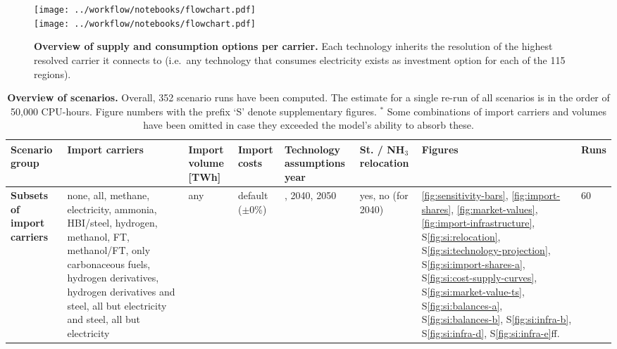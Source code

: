 \begin{figure}[!htb]
    \texttt{[image: ../workflow/notebooks/flowchart.pdf]} \\
    \texttt{[image: ../workflow/notebooks/flowchart.pdf]}
    \caption{\textbf{Overview of supply and consumption options per carrier.}
    Each technology inherits the resolution of the highest resolved carrier it
    connects to (i.e.~any technology that consumes electricity exists as
    investment option for each of the 115 regions).}
    \label{fig:si:supply-consumption-options}
\end{figure}

\begin{table}[!htb]
    \footnotesize
    \setlength{\extrarowheight}{4pt}
    \caption{\textbf{Overview of scenarios.} Overall, 352 scenario runs have
    been computed. The estimate for a single re-run of all scenarios is in the
    order of 50,000 CPU-hours. Figure numbers with the prefix `S' denote
    supplementary figures. $^*$ Some combinations of import carriers and volumes
    have been omitted in case they exceeded the model's ability to absorb
    these.}
    \label{tab:scenarios}
    \begin{tabular}{>{\raggedright\arraybackslash}p{3cm}>{\raggedright\arraybackslash}p{4cm}>{\raggedright\arraybackslash}p{1.8cm}>{\raggedright\arraybackslash}p{2cm}>{\raggedright\arraybackslash}p{1.5cm}>{\raggedright\arraybackslash}p{1.3cm}>{\raggedright\arraybackslash}p{1cm}p{0.5cm}}
    \toprule
    Scenario group & Import carriers & Import volume [TWh] & Import costs & Technology assumptions year & St. / NH$_3$ relocation & Figures & Runs \\
    \midrule
    \textbf{Subsets of import carriers} & none, all, methane, electricity, ammonia, HBI/steel, hydrogen, methanol, FT, methanol/FT, only carbonaceous fuels, hydrogen derivatives, hydrogen derivatives and steel, all but electricity and steel, all but electricity & any & default ($\pm$0\%) & 2030, 2040, 2050 & yes, no (for 2040) & \ref{fig:sensitivity-bars}, \ref{fig:import-shares}, \ref{fig:market-values}, \ref{fig:import-infrastructure}, S\ref{fig:si:relocation}, S\ref{fig:si:technology-projection}, S\ref{fig:si:import-shares-a}, S\ref{fig:si:cost-supply-curves}, S\ref{fig:si:market-value-ts}, S\ref{fig:si:balances-a}, S\ref{fig:si:balances-b}, S\ref{fig:si:infra-b}, S\ref{fig:si:infra-d}, S\ref{fig:si:infra-e}ff. & 60 \\

\end{tabular}
\end{table}

